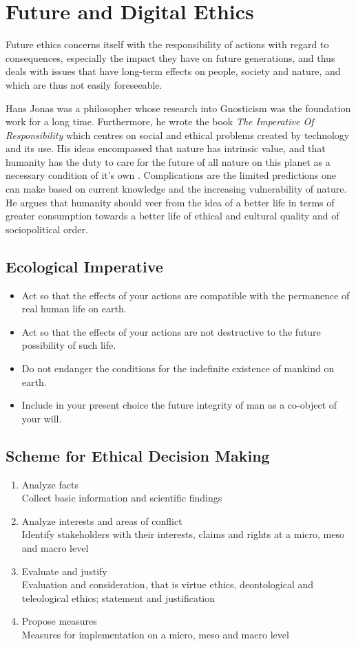 \documentclass[11pt]{article}
\theoremstyle{definition}
\begin{document}
\section{Future and Digital Ethics}
Future ethics concerns itself with the responsibility of actions with regard to consequences, especially the impact they have on future generations, and thus deals with issues that have long-term effects on people, society and nature, and which are thus not easily foreseeable.

Hans Jonas was a philosopher whose research into Gnosticism was the foundation work for a long time. Furthermore, he wrote the book \textit{The Imperative Of Responsibility} which centres on social and ethical problems created by technology and its use. His ideas encompassed that nature has intrinsic value, and that humanity has the duty to care for the future of all nature on this planet as a necessary condition of it's own \parencite{jonas1984imperative}. Complications are the limited predictions one can make based on current knowledge and the increasing vulnerability of nature. He argues that humanity should veer from the idea of a better life in terms of greater consumption towards a better life of ethical and cultural quality and of sociopolitical order.

\subsection{Ecological Imperative}
\begin{itemize}[label=-]
	\item Act so that the effects of your actions are compatible with the permanence of real human life on earth.
	\item Act so that the effects of your actions are not destructive to the future possibility of such life.
	\item Do not endanger the conditions for the indefinite existence of mankind on earth.
	\item Include in your present choice the future integrity of man as a co-object of your will.
\end{itemize}

\subsection{Scheme for Ethical Decision Making}
\begin{enumerate}
	\item Analyze facts\\
	Collect basic information and scientific findings
	\item Analyze interests and areas of conflict\\
	Identify stakeholders with their interests, claims and rights at a micro, meso and macro level
	\item Evaluate and justify\\
	Evaluation and consideration, that is virtue ethics, deontological and teleological ethics; statement and justification
	\item Propose measures\\
	Measures for implementation on a micro, meso and macro level
\end{enumerate}
\end{document}
